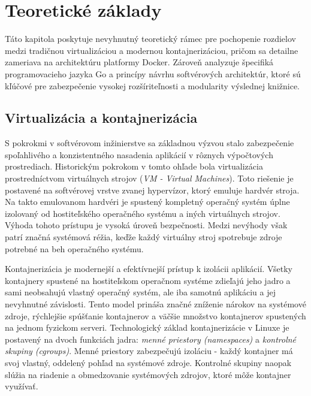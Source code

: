 \documentclass[
 program=infpvs,
  language=slovak,
  figures=false,
  tables=false,
  sourcecodes,
  glossaries,
  index
]{kidiplom}
\begin{document}

\section{Teoretické základy}  \label{sec:teoria}
Táto kapitola poskytuje nevyhnutný teoretický rámec pre pochopenie rozdielov medzi tradičnou virtualizáciou a modernou kontajnerizáciou, pričom sa detailne zameriava na architektúru platformy Docker. Zároveň analyzuje špecifiká programovacieho jazyka Go a princípy návrhu softvérových architektúr, ktoré sú kľúčové pre zabezpečenie vysokej rozšíriteľnosti a modularity výslednej knižnice.



\subsection{Virtualizácia a kontajnerizácia}  \label{sec:virtualizacia}
S pokrokmi v softvérovom inžinierstve sa základnou výzvou stalo zabezpečenie spoľahlivého a konzistentného nasadenia aplikácií v rôznych výpočtových prostrediach. Historickým pokrokom v tomto ohľade bola virtualizácia prostredníctvom virtuálnych strojov (\textit{VM - Virtual Machines}). Toto riešenie je postavené na softvérovej vrstve zvanej hypervízor, ktorý emuluje hardvér stroja. Na takto emulovanom hardvéri je spustený kompletný operačný systém úplne izolovaný od hostiteľského operačného systému a iných virtuálnych strojov. Výhoda tohoto prístupu je vysoká úroveň bezpečnosti. Medzi nevýhody však patrí značná systémová réžia, keďže každý virtuálny stroj spotrebuje zdroje potrebné na beh operačného systému.

Kontajnerizácia je modernejší a efektívnejší prístup k izolácii aplikácií. Všetky kontajnery spustené na hostiteľskom operačnom systéme zdieľajú jeho jadro a sami neobsahujú vlastný operačný systém, ale iba samotnú aplikáciu a jej nevyhnutné závislosti. Tento model prináša značné zníženie nárokov na systémové zdroje, rýchlejšie spúšťanie kontajnerov a väčšie množstvo kontajnerov spustených na jednom fyzickom serveri. Technologický základ kontajnerizácie v Linuxe je postavený na dvoch funkciách jadra: \textit{menné priestory (namespaces)} a \textit{kontrolné skupiny (cgroups)}. Menné priestory zabezpečujú izoláciu - každý kontajner má svoj vlastný, oddelený pohľad na systémové zdroje. Kontrolné skupiny naopak slúžia na riadenie a obmedzovanie systémových zdrojov, ktoré môže kontajner využívať.
\end{document}
